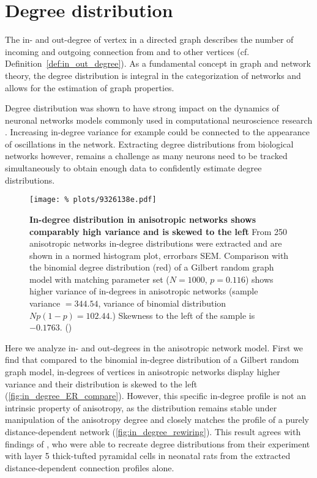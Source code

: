 

\section{Degree distribution}\label{sec:degree_distribution}

The in- and out-degree of vertex in a directed graph describes the
number of incoming and outgoing connection from and to other vertices
(cf. Definition~\ref{def:in_out_degree}). As a fundamental concept in
graph and network theory, the degree distribution is integral in the
categorization of networks and allows for the estimation of graph
properties.

Degree distribution was shown to have strong impact on the dynamics of
neuronal networks models commonly used in computational neuroscience
research \parencite{Roxin2011}. Increasing in-degree variance for
example could be connected to the appearance of oscillations in the
network. Extracting degree distributions from biological networks
however, remains a challenge as many neurons need to be tracked
simultaneously to obtain enough data to confidently estimate degree
distributions. 

\begin{figure}[H]
  \centering
  \texttt{[image: \%
    plots/9326138e.pdf]}
  \caption{\textbf{In-degree distribution in anisotropic networks
      shows comparably high variance and is skewed to the left} From 250
    anisotropic networks in-degree distributions were extracted and
    are shown in a normed histogram plot, errorbars SEM. Comparison with the
    binomial degree distribution (red) of a Gilbert random graph model
    with matching parameter set ($N=1000$, $p =0.116$) shows higher
    variance of in-degrees in anisotropic networks (sample variance $=
    344.54$, variance of binomial distribution $Np(1-p) = 102.44$.)
    Skewness to the left of the sample is $-0.1763.$
    ()}
  \label{fig:in_degree_ER_compare}
\end{figure}

Here we analyze in- and out-degrees in the anisotropic network
model. First we find that compared to the binomial in-degree
distribution of a Gilbert random graph model, in-degrees of vertices
in anisotropic networks display higher variance and their distribution
is skewed to the left (\autoref{fig:in_degree_ER_compare}). However,
this specific in-degree profile is not an intrinsic property of
anisotropy, as the distribution remains stable under manipulation of
the anisotropy degree and closely matches the profile of a purely
distance-dependent network (\autoref{fig:in_degree_rewiring}). This
result agrees with findings of \textcite[Fig. S3]{Perin2011}, who were
able to recreate degree distributions from their experiment with layer
5 thick-tufted pyramidal cells in neonatal rats from the extracted
distance-dependent connection profiles alone.

